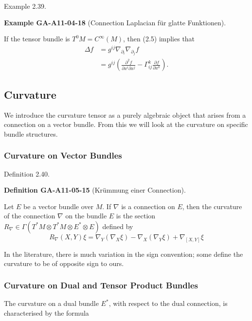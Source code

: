 \documentclass[10pt, letterpaper]{article}
\newcommand{\CustomHeading}[3]{%
  \par\medskip\noindent%
  \textbf{#1 #2} \textnormal{(#3)}.\enskip%
}
\newenvironment{DEF}[2]{\begin{unitbox}\CustomHeading{Definition}{#1}{#2}}{\end{unitbox}}
\newenvironment{EXA}[2]{\begin{unitbox}\CustomHeading{Example}{#1}{#2}}{\end{unitbox}}
\begin{document}
Example 2.39. 

\begin{EXA}{GA-A11-04-18}{Connection Laplacian für glatte Funktionen}
If the tensor bundle is $T^{0} M=C^{\infty}(M)$, then (2.5) implies that
$$
\begin{aligned}
\Delta f & =g^{i j} \nabla_{\partial_{i}} \nabla_{\partial_{j}} f \\
& =g^{i j}\left(\frac{\partial^{2} f}{\partial x^{i} \partial x^{j}}-\Gamma_{i j}^{k} \frac{\partial f}{\partial x^{k}}\right) .
\end{aligned}
$$
\end{EXA}






\subsection*{Curvature}


We introduce the curvature tensor as a purely algebraic object that arises from a connection on a vector bundle. From this we will look at the curvature on specific bundle structures.

\subsubsection*{Curvature on Vector Bundles}

Definition 2.40. 

\begin{DEF}{GA-A11-05-15}{Krümmung einer Connection}
Let $E$ be a vector bundle over $M$. If $\nabla$ is a connection on $E$, then the curvature of the connection $\nabla$ on the bundle $E$ is the section $R_{\nabla} \in \Gamma\left(T^{*} M \otimes T^{*} M \otimes E^{*} \otimes E\right)$ defined by
$$
R_{\nabla}(X, Y) \xi=\nabla_{Y}\left(\nabla_{X} \xi\right)-\nabla_{X}\left(\nabla_{Y} \xi\right)+\nabla_{[X, Y]} \xi
$$
\end{DEF}


In the literature, there is much variation in the sign convention; some define the curvature to be of opposite sign to ours.

\subsubsection*{Curvature on Dual and Tensor Product Bundles}


The curvature on a dual bundle $E^{*}$, with respect to the dual connection, is characterised by the formula
\end{document}
